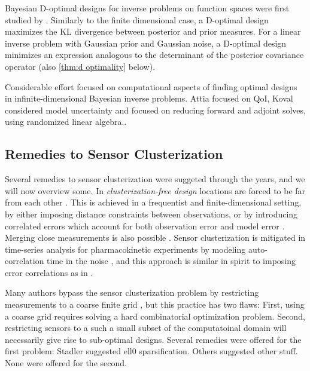 Bayesian D-optimal designs for inverse problems on function spaces
were first studied by \cite{AlexanderianGloorGhattas14,
  AlexanderianPetraStadlerEtAl16,
  AlexanderianPetraStadlerEtAl14}. Similarly to the finite dimensional
case, a D-optimal design maximizes the KL divergence between posterior
and prior measures. For a linear inverse problem with Gaussian prior
and Gaussian noise, a D-optimal design minimizes an expression
analogous to the determinant of the posterior covariance operator
\cite{AlexanderianGloorGhattas14} (also \cref{thm:d optimality}
below).

Considerable effort focused on computational aspects of finding
optimal designs in infinite-dimensional Bayesian inverse problems.
Attia \cite{attia2020} focused on QoI, Koval considered model
uncertainty and focused on reducing forward and adjoint solves, using
randomized linear algebra.\cite{koval2020}.


\subsection{Remedies to Sensor Clusterization}
Several remedies to sensor clusterization were suggeted through the
years, and we will now overview some. In \emph{clusterization-free
design} locations are forced to be far from each other
\cite{Ucinski05}. This is achieved in a frequentist and
finite-dimensional setting, by either imposing distance constraints
between observations, or by introducing correlated errors which
account for both observation error and model error
\cite{Ucinski05}. Merging close measurements is also possible
\cite{fedorov2012}. Sensor clusterization is mitigated in time-series
analysis for pharmacokinetic experiments by modeling auto-correlation
time in the noise \cite{hooker2009}, and this approach is similar in
spirit to imposing error correlations as in \cite{Ucinski05}.


Many authors bypass the sensor clusterization problem by restricting
measurements to a coarse finite grid \cite{koval2020,
  AlexanderianPetraStadlerEtAl16, alexanderian2021, attia2020}, but
this practice has two flaws: First, using a coarse grid requires
solving a hard combinatorial optimization problem. Second, restricting
sensors to a such a small subset of the computatoinal domain will
necessarily give rise to sub-optimal designs. Several remedies were
offered for the first problem: Stadler suggested ell0
sparsification. Others suggested other stuff. None were offered for
the second.


